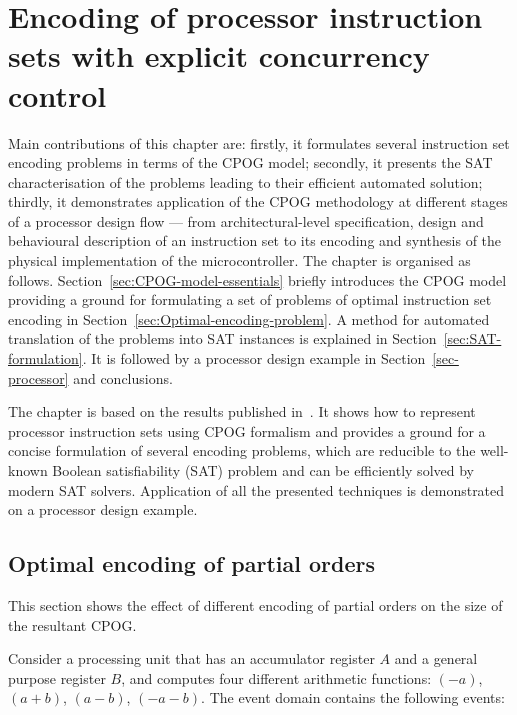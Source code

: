 \chapter{Encoding of processor instruction sets with explicit concurrency control}

Main contributions of this chapter are: firstly, it formulates several
instruction set encoding problems in terms of the CPOG model; secondly,
it presents the SAT characterisation of the problems leading to their
efficient automated solution; thirdly, it demonstrates application
of the CPOG methodology at different stages of a processor design
flow --- from architectural-level specification, design and behavioural
description of an instruction set to its encoding and synthesis of
the physical implementation of the microcontroller. The chapter is organised
as follows. Section~\ref{sec:CPOG-model-essentials} briefly introduces
the CPOG model providing a ground for formulating a set of problems
of optimal instruction set encoding in Section~\ref{sec:Optimal-encoding-problem}.
A method for automated translation of the problems into SAT instances
is explained in Section~\ref{sec:SAT-formulation}. It is followed
by a processor design example in Section~\ref{sec-processor} and
conclusions.

\label{chap:PGEncoding}

The chapter is based on the results published in~\cite{cpog_encoding}. It shows how to represent processor instruction sets using CPOG formalism and provides
a ground for a concise formulation of several encoding problems, which
are reducible to the well-known Boolean satisfiability (SAT) problem
and can be efficiently solved by modern SAT solvers. Application of
all the presented techniques is demonstrated on a processor design
example.

\section{Optimal encoding of partial orders\label{sec:Optimal-encoding-problem}}

This section shows the effect of different encoding of partial orders
on the size of the resultant CPOG.

Consider a processing unit that has an accumulator register $A$ and
a general purpose register $B$, and computes four different arithmetic
functions: $(-a)$, $(a+b)$, $(a-b)$, $(-a-b)$. The event domain
contains the following events:

